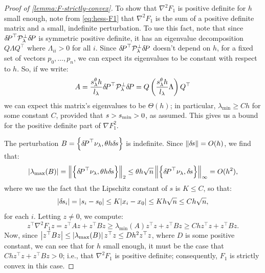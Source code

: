 \documentclass{article}
\begin{document}
\begin{proof}[Proof of \cref{lemma:F-strictly-convex}]
  To show that $\nabla^2 F_1$ is positive definite for $h$ small
  enough, note from \cref{eq:hess-F1} that $\nabla^2 F_1$ is the sum
  of a positive definite matrix and a small, indefinite
  perturbation. To use this fact, note that since
  ${\delta \hspace{-0.14em} P}^\top \mathcal{P}^\perp_\lambda {\delta \hspace{-0.14em} P}$ is symmetric
  positive definite, it has an eigenvalue decomposition
  $Q \Lambda Q^\top$ where $\Lambda_{ii} > 0$ for all $i$. Since
  ${\delta \hspace{-0.14em} P}^\top \mathcal{P}^\perp_\lambda {\delta \hspace{-0.14em} P}$ doesn't depend on
  $h$, for a fixed set of vectors $p_0, \hdots, p_n$, we can expect
  its eigenvalues to be constant with respect to $h$. So, if we write:
  \begin{equation}
    A = \frac{s^\theta_\lambda h}{l_\lambda} {\delta \hspace{-0.14em} P}^\top \mathcal{P}^\perp_\lambda {\delta \hspace{-0.14em} P} = Q \left(\frac{s^\theta_\lambda h}{l_\lambda} \Lambda\right) Q^\top
  \end{equation}
  we can expect this matrix's eigenvalues to be $\Theta(h)$; in
  particular, $\lambda_{\min} \geq C h$ for some constant $C$,
  provided that $s > s_{\operatorname{min}} > 0$, as assumed. This gives us a bound for
  the positive definite part of $\nabla F_1^2$.

  The perturbation $B = \left\{{\delta \hspace{-0.14em} P}^\top \nu_\lambda, \theta h {\delta \hspace{-0.1em} s}\right\}$
  is indefinite. Since $\left\|{\delta \hspace{-0.1em} s}\right\| = O(h)$, we find that:
  \begin{equation}
    |\lambda_{\max}(B)| = \left\|\left\{{\delta \hspace{-0.14em} P}^\top \nu_\lambda,
        \theta h {\delta \hspace{-0.1em} s}\right\}\right\|_2 \leq \theta h \sqrt{n} \left\|\left\{{\delta \hspace{-0.14em} P}^\top \nu_\lambda, {\delta \hspace{-0.1em} s}\right\}\right\|_\infty = O(h^2),
  \end{equation}
  where we use the fact that the Lipschitz constant of $s$ is
  $K \leq C$, so that:
  \begin{equation}
    |{\delta \hspace{-0.1em} s}_i| = |s_i - s_0| \leq K |x_i - x_0| \leq K h \sqrt{n}
    \leq Ch \sqrt{n},
  \end{equation}
  for each $i$. Letting $z \neq 0$, we compute:
  \begin{equation}
    z^\top \nabla^2 F_1 z = z^\top A z + z^\top B z \geq \lambda_{\min}(A) z^\top z + z^\top B z \geq Ch z^\top z + z^\top B z.
  \end{equation}
  Now, since
  $\left|z^\top B z\right| \leq \left|\lambda_{\max}(B)\right| z^\top z \leq D h^2
  z^\top z$, where $D$ is some positive constant, we can see that for
  $h$ small enough, it must be the case that
  $Ch z^\top z + z^\top B z > 0$; i.e., that $\nabla^2 F_1$ is
  positive definite; consequently, $F_1$ is strictly convex in this case.
\end{proof}
\end{document}
